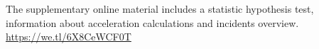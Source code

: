 The supplementary online material includes a statistic hypothesis test, information about acceleration calculations and incidents overview. \url{https://we.tl/6X8CeWCF0T}
